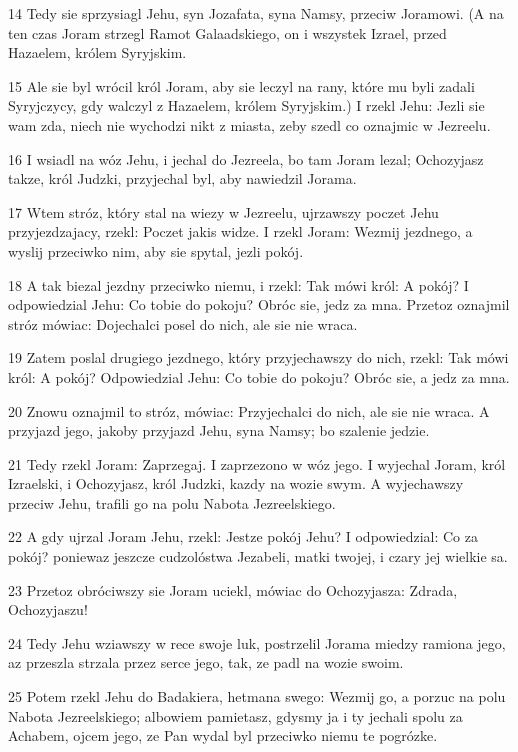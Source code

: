 \par 14 Tedy sie sprzysiagl Jehu, syn Jozafata, syna Namsy, przeciw Joramowi. (A na ten czas Joram strzegl Ramot Galaadskiego, on i wszystek Izrael, przed Hazaelem, królem Syryjskim.
\par 15 Ale sie byl wrócil król Joram, aby sie leczyl na rany, które mu byli zadali Syryjczycy, gdy walczyl z Hazaelem, królem Syryjskim.) I rzekl Jehu: Jezli sie wam zda, niech nie wychodzi nikt z miasta, zeby szedl co oznajmic w Jezreelu.
\par 16 I wsiadl na wóz Jehu, i jechal do Jezreela, bo tam Joram lezal; Ochozyjasz takze, król Judzki, przyjechal byl, aby nawiedzil Jorama.
\par 17 Wtem stróz, który stal na wiezy w Jezreelu, ujrzawszy poczet Jehu przyjezdzajacy, rzekl: Poczet jakis widze. I rzekl Joram: Wezmij jezdnego, a wyslij przeciwko nim, aby sie spytal, jezli pokój.
\par 18 A tak biezal jezdny przeciwko niemu, i rzekl: Tak mówi król: A pokój? I odpowiedzial Jehu: Co tobie do pokoju? Obróc sie, jedz za mna. Przetoz oznajmil stróz mówiac: Dojechalci posel do nich, ale sie nie wraca.
\par 19 Zatem poslal drugiego jezdnego, który przyjechawszy do nich, rzekl: Tak mówi król: A pokój? Odpowiedzial Jehu: Co tobie do pokoju? Obróc sie, a jedz za mna.
\par 20 Znowu oznajmil to stróz, mówiac: Przyjechalci do nich, ale sie nie wraca. A przyjazd jego, jakoby przyjazd Jehu, syna Namsy; bo szalenie jedzie.
\par 21 Tedy rzekl Joram: Zaprzegaj. I zaprzezono w wóz jego. I wyjechal Joram, król Izraelski, i Ochozyjasz, król Judzki, kazdy na wozie swym. A wyjechawszy przeciw Jehu, trafili go na polu Nabota Jezreelskiego.
\par 22 A gdy ujrzal Joram Jehu, rzekl: Jestze pokój Jehu? I odpowiedzial: Co za pokój? poniewaz jeszcze cudzolóstwa Jezabeli, matki twojej, i czary jej wielkie sa.
\par 23 Przetoz obróciwszy sie Joram uciekl, mówiac do Ochozyjasza: Zdrada, Ochozyjaszu!
\par 24 Tedy Jehu wziawszy w rece swoje luk, postrzelil Jorama miedzy ramiona jego, az przeszla strzala przez serce jego, tak, ze padl na wozie swoim.
\par 25 Potem rzekl Jehu do Badakiera, hetmana swego: Wezmij go, a porzuc na polu Nabota Jezreelskiego; albowiem pamietasz, gdysmy ja i ty jechali spolu za Achabem, ojcem jego, ze Pan wydal byl przeciwko niemu te pogrózke.
